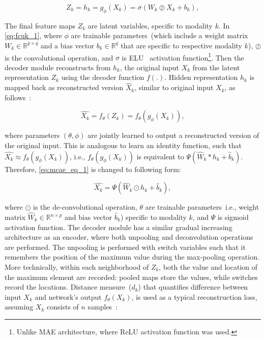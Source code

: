 \begin{equation}
    Z_k = h_{k}=g_\phi \left({X}_{k}\right)=\sigma\left(W_{k} \oslash X_{k}+b_{k}\right),
    \label{eq:fcuk_1}
\end{equation}

\hspace*{3.5mm} The final feature maps $Z_k$ are latent variables, specific to modality $k$. In \cref{eq:fcuk_1}, where $\phi$ are trainable parameters~(which include a weight matrix $W_{k} \in \mathbb{R}^{p \times q}$ and a bias vector $b_{k} \in \mathbb{R}^{q}$ that are specific to respective modality $k$), $\oslash$ is the convolutional operation, and $\sigma$ is ELU~\cite{clevert2015fast} activation function\footnote{Unlike MAE architecture, where ReLU activation function was used.}. Then the decoder module reconstructs from $h_k$, the original input $X_{k}$ from the latent representation $Z_k$ using the decoder function $f(.)$. Hidden representation $h_{k}$ is mapped back as reconstructed version $\hat{X}_{k}$, similar to original input ${X}_{k}$, as follows~\cite{mmdcae}: 

\begin{equation}
    \hat{X_k}=f_{\theta}\left(Z_k\right)=f_{\theta}\left(g_{\phi}({X_k})\right) \label{eq:mcae_eq_1},
\end{equation}

\hspace*{3.5mm} where parameters $(\theta,\phi)$ are jointly learned to output a reconstructed version of the original input. This is analogous to learn an identity function, such that $\hat{X_k} \approx f_{\theta}\left(g_{\phi}({X_k})\right)$, i.e., $f_{\theta}\left(g_{\phi}({X_k})\right)$ is equivalent to $\Psi \left(\hat W_k * h_k + \hat b_{k}\right)$. Therefore,  \cref{eq:mcae_eq_1} is changed to following form: 

\begin{equation}
    \hat{X_k}=\Psi \left(\hat W_k \odot h_k + \hat b_{k}\right),
\end{equation}

\hspace*{3.5mm} where $\odot$ is the de-convolutional operation, $\theta$ are trainable parameters~i.e., weight matrix $\hat W_{k} \in \mathbb{R}^{n \times p}$ and bias vector $\hat b_{k}$) specific to modality $k$, and $\Psi$ is sigmoid activation function. The decoder module has a similar gradual increasing architecture as an encoder, where both unpooling and deconvolution operations are performed. The unpooling is performed with switch variables such that it remembers the position of the maximum value during the max-pooling operation. More technically, within each neighborhood of $Z_k$, both the value and location of the maximum element are recorded: pooled maps store the values, while switches record the locations. Distance measure~($d_{k}$) that quantifies difference between input $X_{k}$ and network's output $f_\theta(X_{k})$, is used as a typical reconstruction loss, assuming $X_k$ consists of $n$ samples~\cite{KarimIEEEAccess2019}: 

